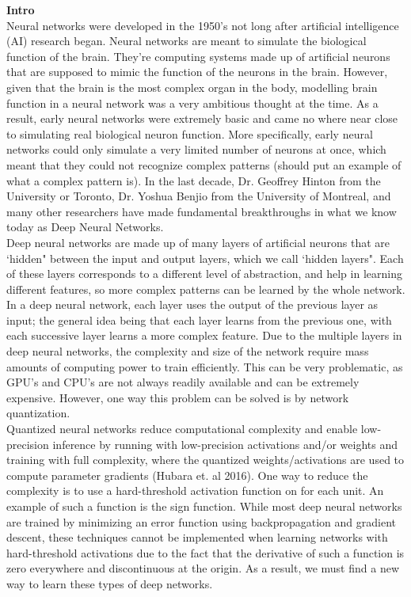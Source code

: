 \documentclass[12pt]{article}
\begin{document}
\textbf{Intro} \\

Neural networks were developed in the 1950's not long after artificial intelligence (AI) research began. Neural networks are meant to simulate the biological function of the brain. They're computing systems made up of artificial neurons that are supposed to mimic the function of the neurons in the brain. However, given that the brain is the most complex organ in the body, modelling brain function in a neural network was a very ambitious thought at the time. As a result, early neural networks were extremely basic and came no where near close to simulating real biological neuron function. More specifically, early neural networks could only simulate a very limited number of neurons at once, which meant that they could not recognize complex patterns (should put an example of what a complex pattern is). In the last decade, Dr. Geoffrey Hinton from the University or Toronto, Dr. Yoshua Benjio from the University of Montreal, and many other researchers have made fundamental breakthroughs in what we know today as Deep Neural Networks. \\

Deep neural networks are made up of many layers of artificial neurons that are `hidden" between the input and output layers, which we call `hidden layers". Each of these layers corresponds to a different level of abstraction, and help in learning different features, so more complex patterns can be learned by the whole network. In a deep neural network, each layer uses the output of the previous layer as input; the general idea being that each layer learns from the previous one, with each successive layer learns a more complex feature. Due to the multiple layers in deep neural networks, the complexity and size of the network require mass amounts of computing power to train efficiently. This can be very problematic, as GPU's and CPU's are not always readily available and can be extremely expensive. However, one way this problem can be solved is by network quantization. \\

Quantized neural networks reduce computational complexity and enable low-precision inference by running with low-precision activations and/or weights and training with full complexity, where the quantized weights/activations are used to compute parameter gradients (Hubara et. al 2016). One way to reduce the complexity is to use a hard-threshold activation function on for each unit. An example of such a function is the sign function. While most deep neural networks are trained by minimizing an error function using backpropagation and gradient descent, these techniques cannot be implemented when learning networks with hard-threshold activations due to the fact that the derivative of such a function is zero everywhere and discontinuous at the origin. As a result, we must find a new way to learn these types of deep networks. \\
\end{document}
